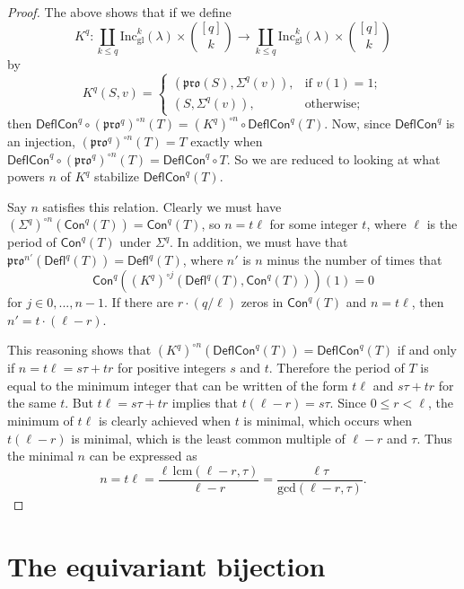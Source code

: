 \documentclass[12pt]{amsart}
\theoremstyle{definition}
\theoremstyle{remark}
\numberwithin{equation}{section}
\newcommand{\inc}{\ensuremath{\mathrm{Inc}}}
\newcommand{\incgl}{\inc_{\mathrm{gl}}}
\newcommand{\pro}{\mathfrak{pro}}
\newcommand{\deflate}{\ensuremath{\mathsf{Defl}}}
\newcommand{\content}{\ensuremath{\mathsf{Con}}}
\newcommand{\compress}{\ensuremath{\mathsf{DeflCon}}}
\begin{document}
  \begin{proof}
  The above shows that if we define 
  \[
  K^q: \coprod_{k \leq q}\incgl^k(\lambda) \times \binom{[q]}{k} \rightarrow \coprod_{k \leq q}\incgl^k(\lambda) \times \binom{[q]}{k}
  \] by
\[
K^q(S,v) =
\begin{cases}
    (\pro(S),\Sigma^q(v)),  & \text{if } v(1) = 1; \\        
   (S,\Sigma^q(v)), & \text{otherwise;}
\end{cases}
\]
then $\compress^q \circ (\pro^q)^{\circ n}(T) = (K^q)^{\circ n} \circ \compress^q(T)$. Now, since $\compress^q$ is an injection, $(\pro^q)^{\circ n}(T) = T$ exactly when $\compress^q \circ (\pro^q)^{\circ n}(T) = \compress^q \circ T$. So we are reduced to looking at what powers $n$ of $K^q$ stabilize $\compress^q(T)$.
 

 
Say $n$ satisfies this relation. Clearly we must have $(\Sigma^q)^{\circ n}(\content^q(T)) = \content^q(T)$, so $n = t \ell$ for some integer $t$, where $\ell$ is the period of $\content^q(T)$ under $\Sigma^q$.  In addition, we must have that $\pro^{n'}(\deflate^q(T)) = \deflate^q(T)$, where $n'$ is $n$ minus the number of times that \[ \content^q((K^q)^{\circ j}(\deflate^q(T),\content^q(T)))(1) = 0\] for $j \in 0,...,n-1$. If there are $r \cdot (q/\ell)$ zeros in $\content^q(T)$ and $n = t \ell$, then $n' = t \cdot(\ell - r)$. 

This reasoning shows that $(K^q)^{\circ n} (\compress^q(T)) = \compress^q(T)$ if and only if $n = t \ell = s \tau + t  r$ for positive integers $s$ and $t$. Therefore the period of $T$ is equal to the minimum integer that can be written of the form $t \ell$ and $s \tau + t r$ for the same $t$. But $t \ell = s\tau + tr$ implies that $t(\ell-r) = s\tau$. Since $0 \leq r < \ell$, the minimum of $t \ell$ is clearly achieved when $t$ is minimal, which occurs when $t(\ell-r)$ is minimal, which is the least common multiple of $\ell-r$ and $\tau$. Thus the minimal $n$ can be expressed as 
\begin{equation}\label{eq:period}
n = t \ell = \frac{\ell \, \text{lcm}(\ell-r,\tau)}{\ell-r} = \frac{\ell \tau}{\text{gcd}(\ell-r,\tau)}. 
\end{equation}
\end{proof}

\section{The equivariant bijection}\label{sec:equivariant}
\end{document}
